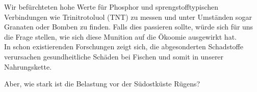 Wir befürchteten hohe Werte für Phosphor und sprengstofftypischen Verbindungen wie Trinitrotoluol (TNT) 
zu messen und unter Umständen sogar Granaten oder Bomben zu finden. Falls dies passieren sollte, würde 
sich für uns die Frage stellen, wie sich diese Munition auf die Ökoomie ausgewirkt hat. \\

In schon existierenden Forschungen zeigt sich, die abgesonderten Schadstoffe verursachen gesundheitliche Schäden bei Fischen 
und somit in unserer Nahrungskette.\cite{munitionsbelastung} 

Aber, wie stark ist die Belastung vor der Südostküste Rügens?
%
%
%






